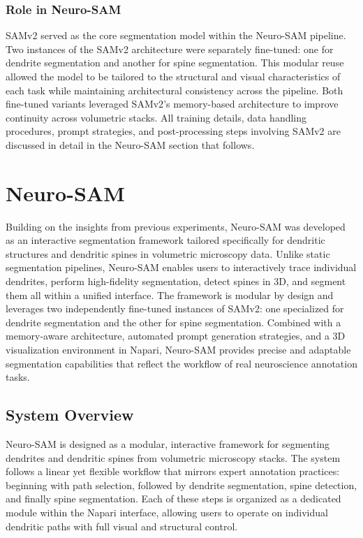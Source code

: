 \subsubsection{\textbf{Role in Neuro-\gls{SAM}}}
\gls{SAMv2} served as the core segmentation model within the Neuro-\gls{SAM} pipeline. Two instances of the \gls{SAMv2} architecture were separately fine-tuned: one for dendrite segmentation and another for spine segmentation. This modular reuse allowed the model to be tailored to the structural and visual characteristics of each task while maintaining architectural consistency across the pipeline. Both fine-tuned variants leveraged \gls{SAMv2}’s memory-based architecture to improve continuity across volumetric stacks. All training details, data handling procedures, prompt strategies, and post-processing steps involving \gls{SAMv2} are discussed in detail in the Neuro-\gls{SAM} section that follows.

\section{Neuro-SAM}
Building on the insights from previous experiments, Neuro-\gls{SAM} was developed as an interactive segmentation framework tailored specifically for dendritic structures and dendritic spines in volumetric microscopy data. Unlike static segmentation pipelines, Neuro-\gls{SAM} enables users to interactively trace individual dendrites, perform high-fidelity segmentation, detect spines in 3D, and segment them all within a unified interface. The framework is modular by design and leverages two independently fine-tuned instances of \gls{SAMv2}: one specialized for dendrite segmentation and the other for spine segmentation. Combined with a memory-aware architecture, automated prompt generation strategies, and a 3D visualization environment in Napari, Neuro-\gls{SAM} provides precise and adaptable segmentation capabilities that reflect the workflow of real neuroscience annotation tasks.

\subsection{System Overview}
Neuro-\gls{SAM} is designed as a modular, interactive framework for segmenting dendrites and dendritic spines from volumetric microscopy stacks. The system follows a linear yet flexible workflow that mirrors expert annotation practices: beginning with path selection, followed by dendrite segmentation, spine detection, and finally spine segmentation. Each of these steps is organized as a dedicated module within the Napari interface, allowing users to operate on individual dendritic paths with full visual and structural control.

